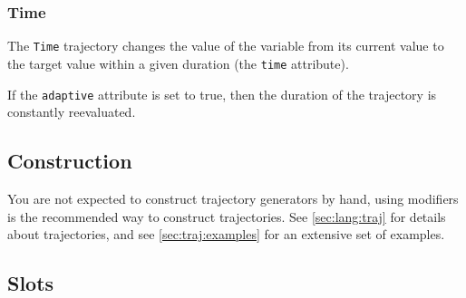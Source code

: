 
\subsubsection{Time}

The \lstinline{Time} trajectory changes the value of the variable from
its current value to the target value within a given duration (the
\lstinline{time} attribute).


If the \lstinline{adaptive} attribute is set to true, then the
duration of the trajectory is constantly reevaluated.


\let\subsubsection\subsubsectionOrig

\subsection{Construction}

You are not expected to construct trajectory generators by hand, using
modifiers is the recommended way to construct trajectories.  See
\autoref{sec:lang:traj} for details about trajectories, and see
\autoref{sec:traj:examples} for an extensive set of examples.

\subsection{Slots}

